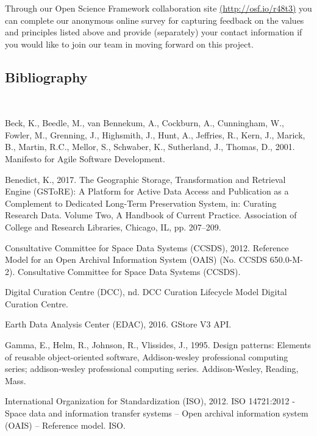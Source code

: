 \documentclass[final]{beamer}
\begin{document}
\begin{frame}[t]
\begin{multicols}{2}
Through our Open Science Framework collaboration site
\href{http://osf.io/r48t3}{(http://osf.io/r48t3)} you can complete our
anonymous online survey for capturing feedback on the values and
principles listed above and provide (separately) your contact
information if you would like to join our team in moving forward on this
project.

\subsection{Bibliography}\label{bibliography}

~

\hypertarget{refs}{}
\hypertarget{ref-beckux5fmanifestoux5f2001}{}
Beck, K., Beedle, M., van Bennekum, A., Cockburn, A., Cunningham, W.,
Fowler, M., Grenning, J., Highsmith, J., Hunt, A., Jeffries, R., Kern,
J., Marick, B., Martin, R.C., Mellor, S., Schwaber, K., Sutherland, J.,
Thomas, D., 2001. Manifesto for Agile Software Development.

\hypertarget{ref-benedictux5fgeographicux5f2017}{}
Benedict, K., 2017. The Geographic Storage, Transformation and Retrieval
Engine (GSToRE): A Platform for Active Data Access and Publication as a
Complement to Dedicated Long-Term Preservation System, in: Curating
Research Data. Volume Two, A Handbook of Current Practice. Association
of College and Research Libraries, Chicago, IL, pp. 207--209.

\hypertarget{ref-bookux5freferenceux5f2012}{}
Consultative Committee for Space Data Systems (CCSDS), 2012. Reference
Model for an Open Archival Information System (OAIS) (No. CCSDS
650.0-M-2). Consultative Committee for Space Data Systems (CCSDS).

\hypertarget{ref-digitalux5fcurationux5fcentreux5fdccux5fdccux5fnd}{}
Digital Curation Centre (DCC), nd. DCC Curation Lifecycle Model
\textbar{} Digital Curation Centre.

\hypertarget{ref-ux5fgstoreux5f2016}{}
Earth Data Analysis Center (EDAC), 2016. GStore V3 API.

\hypertarget{ref-gammaux5fdesignux5f1995}{}
Gamma, E., Helm, R., Johnson, R., Vlissides, J., 1995. Design patterns:
Elements of reusable object-oriented software, Addison-wesley
professional computing series; addison-wesley professional computing
series. Addison-Wesley, Reading, Mass.

\hypertarget{ref-ux5fisoux5f2012}{}
International Organization for Standardization (ISO), 2012. ISO
14721:2012 - Space data and information transfer systems -- Open
archival information system (OAIS) -- Reference model. ISO.


\end{multicols}
\end{frame}
\end{document}
